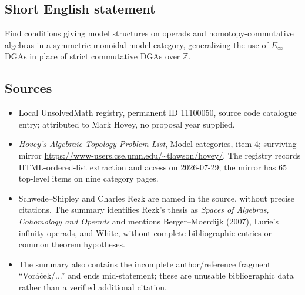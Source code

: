 \documentclass[11pt]{article}
\newcommand{\Z}{\mathbb{Z}}
\begin{document}
\subsection{Short English statement}
Find conditions giving model structures on operads and homotopy-commutative algebras in a symmetric monoidal model category, generalizing the use of $E_\infty$ DGAs in place of strict commutative DGAs over $\Z$.
\subsection{Sources}
\begin{itemize}
\item Local UnsolvedMath registry, permanent ID 11100050, source code catalogue entry; attributed to Mark Hovey, no proposal year supplied.
\item \emph{Hovey's Algebraic Topology Problem List}, Model categories, item 4; surviving mirror \url{https://www-users.cse.umn.edu/~tlawson/hovey/}. The registry records HTML-ordered-list extraction and access on 2026-07-29; the mirror has 65 top-level items on nine category pages.
\item Schwede--Shipley and Charles Rezk are named in the source, without precise citations. The summary identifies Rezk's thesis as \emph{Spaces of Algebras, Cohomology and Operads} and mentions Berger--Moerdijk (2007), Lurie's infinity-operads, and White, without complete bibliographic entries or common theorem hypotheses.
\item The summary also contains the incomplete author/reference fragment ``Vor\'a\v cek/...'' and ends mid-statement; these are unusable bibliographic data rather than a verified additional citation.
\end{itemize}
\end{document}
